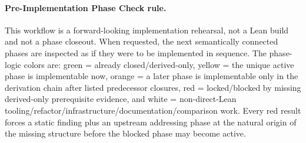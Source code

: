 \paragraph{Pre-Implementation Phase Check rule.} This workflow is a forward-looking implementation rehearsal, not a Lean build and not a phase closeout. When requested, the next semantically connected phases are inspected as if they were to be implemented in sequence. The phase-logic colors are: green = already closed/derived-only, yellow = the unique active phase is implementable now, orange = a later phase is implementable only in the derivation chain after listed predecessor closures, red = locked/blocked by missing derived-only prerequisite evidence, and white = non-direct-Lean tooling/refactor/infrastructure/documentation/comparison work. Every red result forces a static finding plus an upstream addressing phase at the natural origin of the missing structure before the blocked phase may become active.

